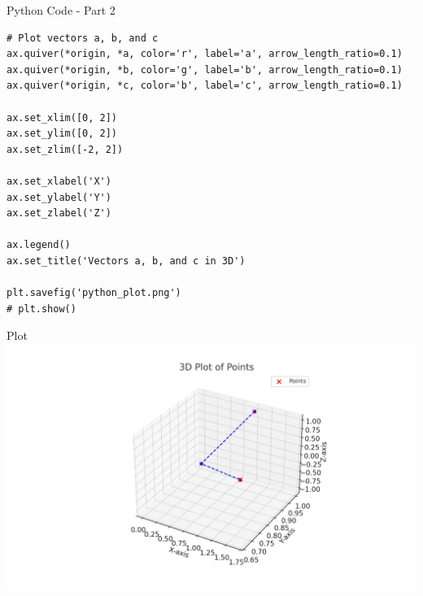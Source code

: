 \documentclass{beamer}
\begin{document}
\begin{frame}[fragile]{Python Code - Part 2}
\begin{verbatim}
# Plot vectors a, b, and c
ax.quiver(*origin, *a, color='r', label='a', arrow_length_ratio=0.1)
ax.quiver(*origin, *b, color='g', label='b', arrow_length_ratio=0.1)
ax.quiver(*origin, *c, color='b', label='c', arrow_length_ratio=0.1)

ax.set_xlim([0, 2])
ax.set_ylim([0, 2])
ax.set_zlim([-2, 2])

ax.set_xlabel('X')
ax.set_ylabel('Y')
ax.set_zlabel('Z')

ax.legend()
ax.set_title('Vectors a, b, and c in 3D')

plt.savefig('python_plot.png')
# plt.show()
\end{verbatim}
\end{frame}




\begin{frame}{Plot}
    \centering
    \includegraphics[width=\columnwidth, height=0.8\textheight, keepaspectratio]{figs/python_plot.png}     
\end{frame}
\end{document}
